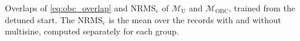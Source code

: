 \begin{table}[t]
  \centering
  \caption{Overlaps of \eqref{eq:obc_overlap} and $\mathrm{NRMS}_e$ of $\mathcal M_{\mathrm U}$ and $\mathcal M_{\mathrm{OBC}}$, trained from the detuned start. The $\mathrm{NRMS}_e$ is the mean over the records with and without multisine, computed separately for each group.}
  \label{tab:res_obc_constraint}
  
\end{table}

